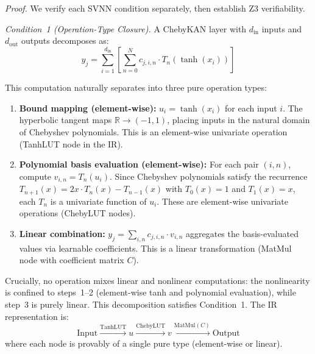 \vspace{4pt}
\noindent\textit{Proof.} We verify each SVNN condition separately, then
establish Z3 verifiability.

\vspace{2pt}
\noindent\textit{Condition~1 (Operation-Type Closure).}
A ChebyKAN layer with $d_{\text{in}}$ inputs and $d_{\text{out}}$ outputs
decomposes as:
\begin{equation}
y_j = \sum_{i=1}^{d_{\text{in}}} \left[ \sum_{n=0}^{N} c_{j,i,n} \cdot
T_n(\tanh(x_i)) \right]
\label{eq:chebykan_layer}
\end{equation}

This computation naturally separates into three pure operation types:
\begin{enumerate}
    \item \textbf{Bound mapping (element-wise):}
          $u_i = \tanh(x_i)$ for each input $i$. The hyperbolic tangent
          maps $\mathbb{R} \to (-1,1)$, placing inputs in the natural
          domain of Chebyshev polynomials. This is an element-wise
          univariate operation (TanhLUT node in the IR).

    \item \textbf{Polynomial basis evaluation (element-wise):}
          For each pair $(i,n)$, compute $v_{i,n} = T_n(u_i)$. Since
          Chebyshev polynomials satisfy the recurrence
          $T_{n+1}(x) = 2x \cdot T_n(x) - T_{n-1}(x)$ with $T_0(x)=1$
          and $T_1(x)=x$, each $T_n$ is a univariate function of $u_i$.
          These are element-wise univariate operations (ChebyLUT nodes).

    \item \textbf{Linear combination:}
          $y_j = \sum_{i,n} c_{j,i,n} \cdot v_{i,n}$ aggregates the
          basis-evaluated values via learnable coefficients. This is a
          linear transformation (MatMul node with coefficient matrix $C$).
\end{enumerate}

Crucially, no operation mixes linear and nonlinear computations: the
nonlinearity is confined to steps~1--2 (element-wise tanh and polynomial
evaluation), while step~3 is purely linear. This decomposition satisfies
Condition~1. The IR representation is:
\begin{equation}
\text{Input} \xrightarrow{\text{TanhLUT}} u \xrightarrow{\text{ChebyLUT}}
v \xrightarrow{\text{MatMul}(C)} \text{Output}
\end{equation}
where each node is provably of a single pure type (element-wise or linear).

